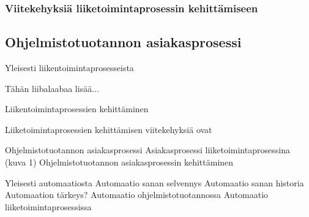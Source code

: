 \documentclass[finnish,12pt,a4paper,pdftex]{article}
\begin{document}


\subsubsection{Viitekehyksiä liiketoimintaprosessin kehittämiseen}




\subsection{Ohjelmistotuotannon asiakasprosessi}
Yleisesti liikentoimintaprosesseista

Tähän liibalaabaa lisää...

        Liikentoimintaprosessien kehittäminen
   
Liiketoimintaprosessien kehittämisen viitekehyksiä ovat 
        
 
 
Ohjelmistotuotannon asiakasprosessi
         Asiakasprosessi liiketoimintaprosessina (kuva 1)
         Ohjelmistotuotannon asiakasprosessin kehittäminen
         
         
         
         
Yleisesti automaatiosta
        Automaatio sanan selvennys
        Automaatio sanan historia
        Automaation tärkeys?
        Automaatio ohjelmistotuotannossa
        Automaatio liiketoimintaprosessissa

 
 
 
 
\end{document}
